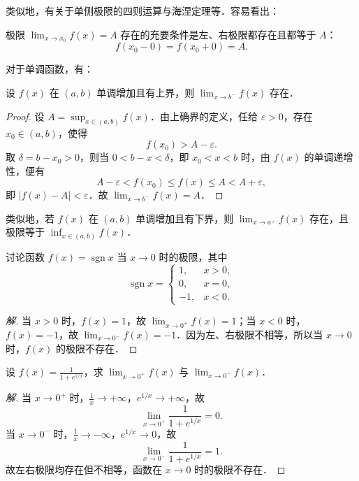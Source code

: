 类似地，有关于单侧极限的四则运算与海涅定理等．容易看出：

\begin{corollary}\label{cor:3-5}
极限 $\lim_{x \to x_0} f(x) = A$ 存在的充要条件是左、右极限都存在且都等于 $A$：
\[
f(x_0 - 0) = f(x_0 + 0) = A.
\]
\end{corollary}

对于单调函数，有：

\begin{theorem}\label{thm:3-12}
设 $f(x)$ 在 $(a, b)$ 单调增加且有上界，则 $\lim_{x \to b^-} f(x)$ 存在．
\end{theorem}

\begin{proof}
设 $A = \sup_{x \in (a, b)} f(x)$．由上确界的定义，任给 $\varepsilon > 0$，存在 $x_0 \in (a, b)$，使得
\[
f(x_0) > A - \varepsilon.
\]
取 $\delta = b - x_0 > 0$，则当 $0 < b - x < \delta$，即 $x_0 < x < b$ 时，由 $f(x)$ 的单调递增性，便有
\[
A - \varepsilon < f(x_0) \leqslant f(x) \leqslant A < A + \varepsilon,
\]
即 $|f(x) - A| < \varepsilon$．故 $\lim_{x \to b^-} f(x) = A$．
\end{proof}

类似地，若 $f(x)$ 在 $(a, b)$ 单调增加且有下界，则 $\lim_{x \to a^+} f(x)$ 存在，且极限等于 $\inf_{x \in (a, b)} f(x)$．

\begin{example}\label{ex:3-3-7}
讨论函数 $f(x) = \operatorname{sgn} x$ 当 $x \to 0$ 时的极限，其中
\[
\operatorname{sgn} x = \begin{cases}
1, & x > 0, \\
0, & x = 0, \\
-1, & x < 0.
\end{cases}
\]
\end{example}

\begin{proof}[解]
当 $x > 0$ 时，$f(x) = 1$，故 $\lim_{x \to 0^+} f(x) = 1$；当 $x < 0$ 时，$f(x) = -1$，故 $\lim_{x \to 0^-} f(x) = -1$．因为左、右极限不相等，所以当 $x \to 0$ 时，$f(x)$ 的极限不存在．
\end{proof}

\begin{example}\label{ex:3-3-8}
设 $f(x) = \frac{1}{1 + e^{1/x}}$，求 $\lim_{x \to 0^+} f(x)$ 与 $\lim_{x \to 0^-} f(x)$．
\end{example}

\begin{proof}[解]
当 $x \to 0^+$ 时，$\frac{1}{x} \to +\infty$，$e^{1/x} \to +\infty$，故
\[
\lim_{x \to 0^+} \frac{1}{1 + e^{1/x}} = 0.
\]
当 $x \to 0^-$ 时，$\frac{1}{x} \to -\infty$，$e^{1/x} \to 0$，故
\[
\lim_{x \to 0^-} \frac{1}{1 + e^{1/x}} = 1.
\]
故左右极限均存在但不相等，函数在 $x \to 0$ 时的极限不存在．
\end{proof}

